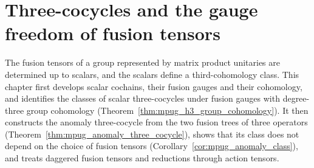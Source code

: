 \chapter{Three-cocycles and the gauge freedom of fusion tensors}
\label{ch:mpu_cocycles}

The fusion tensors of a group represented by matrix product unitaries are
determined up to scalars, and the scalars define a third-cohomology class. This
chapter first develops scalar cochains, their fusion gauges and their
cohomology, and identifies the classes of scalar three-cocycles under fusion
gauges with degree-three group cohomology
(Theorem~\ref{thm:mpug_h3_group_cohomology}). It then constructs the anomaly
three-cocycle from the two fusion trees of three operators
(Theorem~\ref{thm:mpug_anomaly_three_cocycle}), shows that its class does not
depend on the choice of fusion tensors
(Corollary~\ref{cor:mpug_anomaly_class}), and treats daggered fusion tensors
and reductions through action tensors.




